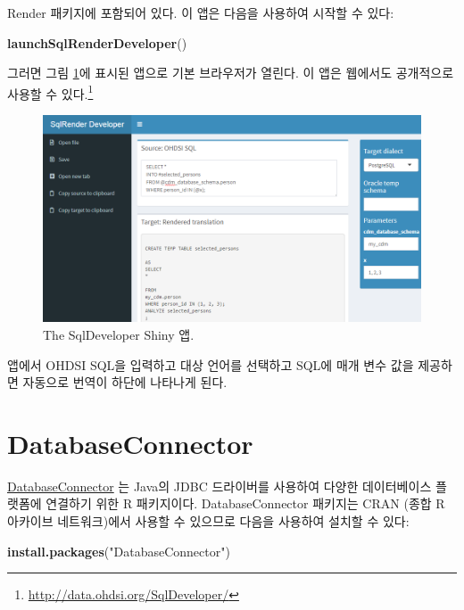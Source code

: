 \documentclass[11pt]{book}
\newenvironment{Shaded}{\begin{snugshade}}{\end{snugshade}}
\newcommand{\KeywordTok}[1]{\textcolor[rgb]{0.13,0.29,0.53}{\textbf{#1}}}
\newcommand{\StringTok}[1]{\textcolor[rgb]{0.31,0.60,0.02}{#1}}
\newcommand{\NormalTok}[1]{#1}
\let\rmarkdownfootnote\footnote%
\def\footnote{\protect\rmarkdownfootnote}
\theoremstyle{definition}
\theoremstyle{definition}
\theoremstyle{definition}
\theoremstyle{remark}
\begin{document}
Render 패키지에 포함되어 있다. 이 앱은 다음을 사용하여 시작할 수 있다:

\begin{Shaded}
\begin{Highlighting}[]
\KeywordTok{launchSqlRenderDeveloper}\NormalTok{()}
\end{Highlighting}
\end{Shaded}

그러면 그림 \ref{fig:sqlDeveloper}에 표시된 앱으로 기본 브라우저가
열린다. 이 앱은 웹에서도 공개적으로 사용할 수 있다.\footnote{\url{http://data.ohdsi.org/SqlDeveloper/}}

\begin{figure}

{\centering \includegraphics[width=1\linewidth]{images/SqlAndR/sqlDeveloper} 

}

\caption{The SqlDeveloper Shiny 앱.}\label{fig:sqlDeveloper}
\end{figure}

앱에서 OHDSI SQL을 입력하고 대상 언어를 선택하고 SQL에 매개 변수 값을
제공하면 자동으로 번역이 하단에 나타나게 된다.

\hypertarget{DatabaseConnector}{\section{DatabaseConnector}\label{DatabaseConnector}}

\href{https://ohdsi.github.io/DatabaseConnector/}{DatabaseConnector} 는
Java의 JDBC 드라이버를 사용하여 다양한 데이터베이스 플랫폼에 연결하기
위한 R 패키지이다. DatabaseConnector 패키지는 CRAN (종합 R 아카이브
네트워크)에서 사용할 수 있으므로 다음을 사용하여 설치할 수 있다:

\begin{Shaded}
\begin{Highlighting}[]
\KeywordTok{install.packages}\NormalTok{(}\StringTok{"DatabaseConnector"}\NormalTok{)}
\end{Highlighting}
\end{Shaded}
\end{document}
